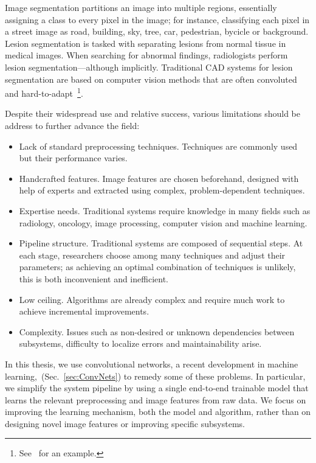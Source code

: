 Image segmentation partitions an image into multiple regions, essentially assigning a class to every pixel in the image; for instance, classifying each pixel in a street image as road, building, sky, tree, car, pedestrian, bycicle or background. Lesion segmentation is tasked with separating lesions from normal tissue in medical images. When searching for abnormal findings, radiologists perform lesion segmentation---although implicitly. Traditional CAD systems for lesion segmentation are based on computer vision methods that are often convoluted and hard-to-adapt~\footnote{See~\cite{Ashraf2013} for an example.}. 

Despite their widespread use and relative success, various limitations should be address to further advance the field:
\begin{itemize}
	\item Lack of standard preprocessing techniques. Techniques are commonly used but their performance varies.
	\item Handcrafted features. Image features are chosen beforehand, designed with help of experts and extracted using complex, problem-dependent techniques.
	\item Expertise needs. Traditional systems require knowledge in many fields such as radiology, oncology, image processing, computer vision and machine learning.
	\item Pipeline structure. Traditional systems are composed of sequential steps. At each stage, researchers choose among many techniques and adjust their parameters; as achieving an optimal combination of techniques is unlikely, this is both inconvenient and inefficient.
	\item Low ceiling. Algorithms are already complex and require much work to achieve incremental improvements.
	\item Complexity. Issues such as non-desired or unknown dependencies between subsystems, difficulty to localize errors and maintainability arise. 
\end{itemize}

In this thesis, we use convolutional networks, a recent development in machine learning,~(Sec.~\ref{sec:ConvNets}) to remedy some of these problems. In particular, we simplify the system pipeline by using a single end-to-end trainable model that learns the relevant preprocessing and image features from raw data. We focus on improving the learning mechanism, both the model and algorithm, rather than on designing novel image features or improving specific subsystems.
